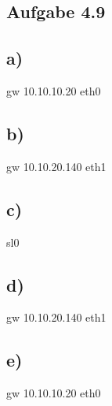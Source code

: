 \documentclass{article}
\begin{document}
	\subsection*{Aufgabe 4.9}
	\subsection*{a)}
	gw 10.10.10.20 eth0
	\subsection*{b)}
	gw 10.10.20.140 eth1
	\subsection*{c)}
	sl0
	\subsection*{d)}
	gw 10.10.20.140 eth1
	\subsection*{e)}
	gw 10.10.10.20 eth0
	
\end{document}
